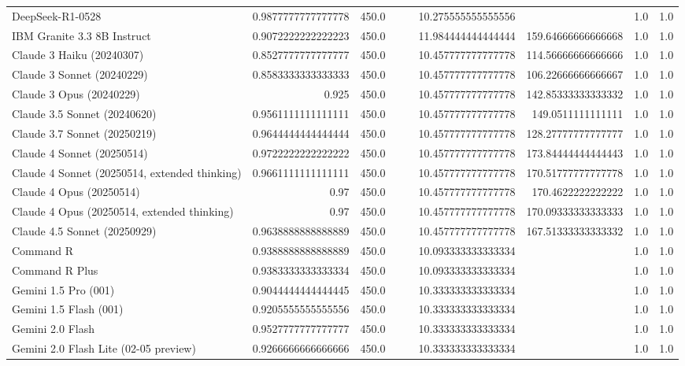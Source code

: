 \begin{table}[htp]
{\begin{tabular}{lrrrrrrrr}
DeepSeek-R1-0528 & 0.9877777777777778 & 450.0 &  &  & 10.275555555555556 &  & 1.0 & 1.0 \\
IBM Granite 3.3 8B Instruct & 0.9072222222222223 & 450.0 &  &  & 11.984444444444444 & 159.64666666666668 & 1.0 & 1.0 \\
Claude 3 Haiku (20240307) & 0.8527777777777777 & 450.0 &  &  & 10.457777777777778 & 114.56666666666666 & 1.0 & 1.0 \\
Claude 3 Sonnet (20240229) & 0.8583333333333333 & 450.0 &  &  & 10.457777777777778 & 106.22666666666667 & 1.0 & 1.0 \\
Claude 3 Opus (20240229) & 0.925 & 450.0 &  &  & 10.457777777777778 & 142.85333333333332 & 1.0 & 1.0 \\
Claude 3.5 Sonnet (20240620) & 0.9561111111111111 & 450.0 &  &  & 10.457777777777778 & 149.0511111111111 & 1.0 & 1.0 \\
Claude 3.7 Sonnet (20250219) & 0.9644444444444444 & 450.0 &  &  & 10.457777777777778 & 128.27777777777777 & 1.0 & 1.0 \\
Claude 4 Sonnet (20250514) & 0.9722222222222222 & 450.0 &  &  & 10.457777777777778 & 173.84444444444443 & 1.0 & 1.0 \\
Claude 4 Sonnet (20250514, extended thinking) & 0.9661111111111111 & 450.0 &  &  & 10.457777777777778 & 170.51777777777778 & 1.0 & 1.0 \\
Claude 4 Opus (20250514) & 0.97 & 450.0 &  &  & 10.457777777777778 & 170.4622222222222 & 1.0 & 1.0 \\
Claude 4 Opus (20250514, extended thinking) & 0.97 & 450.0 &  &  & 10.457777777777778 & 170.09333333333333 & 1.0 & 1.0 \\
Claude 4.5 Sonnet (20250929) & 0.9638888888888889 & 450.0 &  &  & 10.457777777777778 & 167.51333333333332 & 1.0 & 1.0 \\
Command R & 0.9388888888888889 & 450.0 &  &  & 10.093333333333334 &  & 1.0 & 1.0 \\
Command R Plus & 0.9383333333333334 & 450.0 &  &  & 10.093333333333334 &  & 1.0 & 1.0 \\
Gemini 1.5 Pro (001) & 0.9044444444444445 & 450.0 &  &  & 10.333333333333334 &  & 1.0 & 1.0 \\
Gemini 1.5 Flash (001) & 0.9205555555555556 & 450.0 &  &  & 10.333333333333334 &  & 1.0 & 1.0 \\
Gemini 2.0 Flash & 0.9527777777777777 & 450.0 &  &  & 10.333333333333334 &  & 1.0 & 1.0 \\
Gemini 2.0 Flash Lite (02-05 preview) & 0.9266666666666666 & 450.0 &  &  & 10.333333333333334 &  & 1.0 & 1.0 \\

\end{tabular}}
\end{table}
